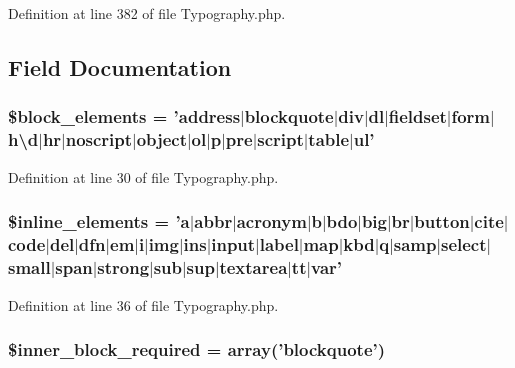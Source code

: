 Definition at line 382 of file Typography.\-php.



\subsection{Field Documentation}
\subsubsection[{\$block\-\_\-elements}]{\setlength{\rightskip}{0pt plus 5cm}\$block\-\_\-elements = 'address$|$blockquote$|${\bf div}$|$dl$|$fieldset$|$form$|$h\textbackslash{}d$|$hr$|$noscript$|$object$|$ol$|${\bf p}$|$pre$|$script$|$table$|$ul'}\label{class_c_i___typography_ac99f5bbe8e02dc1147e9a4205dc161eb}


Definition at line 30 of file Typography.\-php.

\subsubsection[{\$inline\-\_\-elements}]{\setlength{\rightskip}{0pt plus 5cm}\$inline\-\_\-elements = '{\bf a}$|$abbr$|$acronym$|${\bf b}$|$bdo$|$big$|$br$|$button$|$cite$|$code$|$del$|$dfn$|$em$|${\bf i}$|$img$|$ins$|$input$|$label$|$map$|$kbd$|${\bf q}$|$samp$|$select$|$small$|$span$|$strong$|${\bf sub}$|${\bf sup}$|$textarea$|$tt$|$var'}\label{class_c_i___typography_a7ee5f0598125dc7e6b17a08aa6da384f}


Definition at line 36 of file Typography.\-php.

\subsubsection[{\$inner\-\_\-block\-\_\-required}]{\setlength{\rightskip}{0pt plus 5cm}\$inner\-\_\-block\-\_\-required = array('blockquote')}\label{class_c_i___typography_a822eaf22f556c5c52bd766779d9ee22f}


